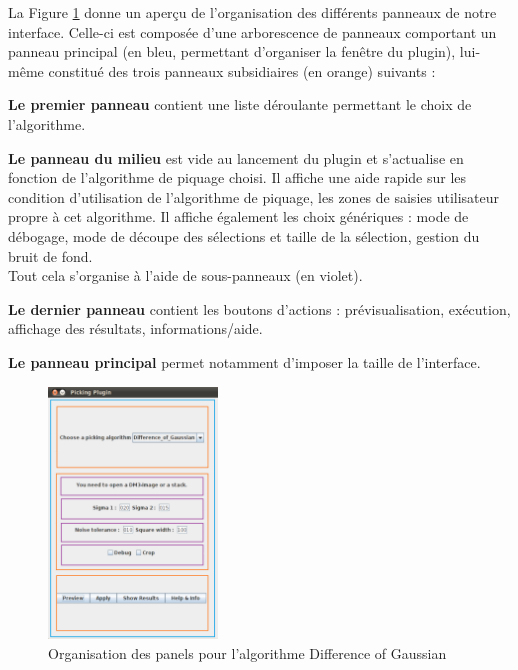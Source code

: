 La Figure \ref{panneaux} donne un aperçu de l'organisation des différents panneaux de notre interface. Celle-ci est composée d'une arborescence de panneaux comportant un panneau principal (en bleu, permettant d'organiser la fenêtre du plugin), lui-m\^eme constitué des trois panneaux subsidiaires (en orange) suivants :
\begin{description}
\item \textbf{Le premier panneau} contient une liste déroulante permettant le choix de l'algorithme. 
\item \textbf{Le panneau du milieu} est vide au lancement du plugin et s'actualise en fonction de l'algorithme de piquage choisi. Il affiche une aide rapide sur les condition d'utilisation de l'algorithme de piquage, les zones de saisies utilisateur propre à cet algorithme. Il affiche également les choix génériques : mode de débogage, mode de découpe des sélections et taille de la sélection, gestion du bruit de fond. \\
Tout cela s'organise à l'aide de sous-panneaux (en violet).
\item \textbf{Le dernier panneau} contient les boutons d'actions : prévisualisation, exécution, affichage des résultats, informations/aide.
\item \textbf{Le panneau principal} permet notamment d'imposer la taille de l'interface.
\end{description}

\begin{figure}[!h] 
\begin{center}
\includegraphics[width=0.4\textwidth]{pluginCadres.png}
\caption{Organisation des panels pour l'algorithme Difference of Gaussian}
\label{panneaux}
\end{center}
\end{figure}
\pagebreak

